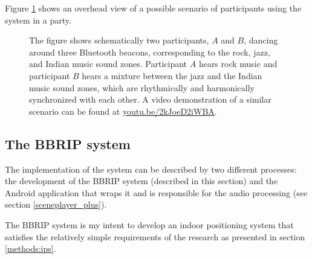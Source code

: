 \documentclass[a4paper,11pt]{article}
\begin{document}
Figure \ref{fig:sys:participant_view} shows an overhead view of a possible scenario of participants using the system in a party.

\begin{figure}[!htb]
	\centering
	\def\svgwidth{0.9\textwidth}
	
	\caption{The figure shows schematically two participants, $A$ and $B$, dancing around three Bluetooth beacons, corresponding to the rock, jazz, and Indian music sound zones. Participant $A$ hears rock music and participant $B$ hears a mixture between the jazz and the Indian music sound zones, which are rhythmically and harmonically synchronized with each other. A video demonstration of a similar scenario can be found at \href{http://youtu.be/2kJoeD2iWBA}{youtu.be/2kJoeD2iWBA}.}\label{fig:sys:participant_view}
\end{figure}

\subsection{The BBRIP system}

The implementation of the system can be described by two different processes: the development of the BBRIP system (described in this section) and the Android application that wraps it and is responsible for the audio processing (see section \ref{sceneplayer_plus}).

The BBRIP system is my intent to develop an indoor positioning system that satisfies the relatively simple requirements of the research as presented in section \ref{methods:ips}.
\end{document}
